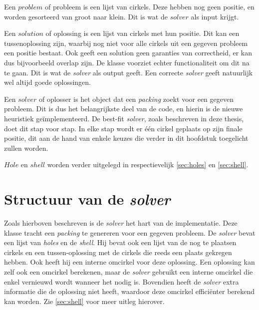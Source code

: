 \documentclass[12pt,a4paper,oneside]{book}
\begin{document}
{Een $problem$ of probleem is een lijst van cirkels.
Deze hebben nog geen positie, en worden gesorteerd van groot naar klein.
Dit is wat de $solver$ als input krijgt.

Een $solution$ of oplossing is een lijst van cirkels met hun positie.
Dit kan een tussenoplossing zijn, waarbij nog niet voor alle cirkels uit een gegeven probleem een positie bestaat.
Ook geeft een solution geen garanties van correctheid, er kan dus bijvoorbeeld overlap zijn. De klasse voorziet echter functionaliteit om dit na te gaan.
Dit is wat de \textit{solver} als output geeft.
Een correcte \textit{solver} geeft natuurlijk wel altijd goede oplossingen. %

Een $solver$ of oplosser is het object dat een \textit{packing} zoekt voor een gegeven probleem.
Dit is dus het belangrijkste deel van de code, en hierin is de nieuwe heuristiek geïmplementeerd.
De best-fit \textit{solver}, zoals beschreven in deze thesis, doet dit stap voor stap.
In elke stap wordt er één cirkel geplaats op zijn finale positie, dit aan de hand van enkele keuzes die verder in dit hoofdstuk toegelicht zullen worden.

$Hole$ en $shell$ worden verder uitgelegd in respectievelijk \autoref{sec:holes} en \autoref{sec:shell}.

\section{Structuur van de \textit{solver}}

Zoals hierboven beschreven is de \textit{solver} het hart van de implementatie.
Deze klasse tracht een \textit{packing} te genereren voor een gegeven probleem.
De \textit{solver} bevat een lijst van \textit{holes} en de \textit{shell}.
Hij bevat ook een lijst van de nog te plaatsen cirkels en een tussen-oplossing met de cirkels die reeds een plaats gekregen hebben.
Ook heeft hij een interne omcirkel voor deze oplossing.
Een oplossing kan zelf ook een omcirkel berekenen, maar de \textit{solver} gebruikt een interne omcirkel die enkel vernieuwd wordt wanneer het nodig is.
Bovendien heeft de \textit{solver} extra informatie die de oplossing niet heeft, waardoor deze omcirkel efficiënter berekend kan worden.  %
Zie \autoref{sec:shell} voor meer uitleg hierover. %

}
\end{document}

